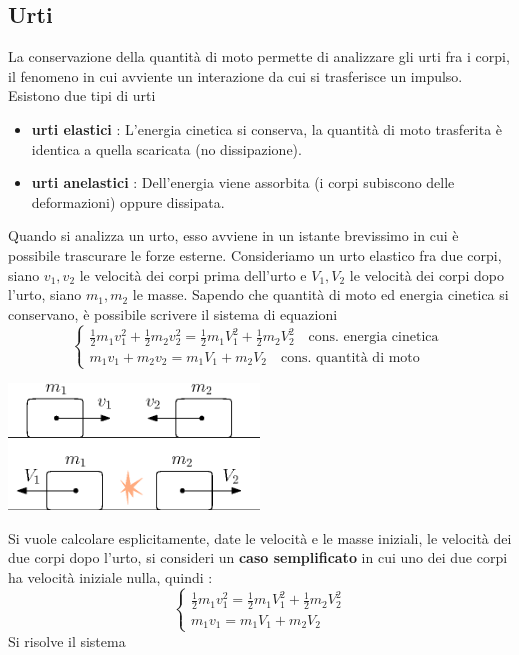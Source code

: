 \documentclass[10pt, letterpaper]{report}
\begin{document}
\subsection{Urti}
La conservazione della quantità di moto permette di analizzare 
gli urti fra i corpi, il fenomeno in cui avviente un interazione da cui 
si trasferisce un impulso. Esistono due tipi di urti\begin{itemize}
    \item \textbf{urti elastici} : L'energia cinetica si conserva, la quantità di 
    moto trasferita è identica a quella scaricata (no dissipazione). 
    \item \textbf{urti anelastici} : Dell'energia viene assorbita (i corpi 
    subiscono delle deformazioni) oppure dissipata.
\end{itemize}
Quando si analizza un urto, esso avviene in un istante brevissimo in 
cui è possibile 
trascurare le forze esterne. Consideriamo un urto elastico fra due 
corpi, siano $v_1,v_2$ le velocità dei corpi prima dell'urto e 
$V_1,V_2$ le velocità dei corpi dopo l'urto, siano $m_1,m_2$ le masse. Sapendo che quantità di moto ed 
energia cinetica si conservano, è possibile scrivere il sistema di equazioni 
$$ \begin{cases}
    \frac{1}{2}m_1v_1^2+\frac{1}{2}m_2v_2^2 =  \frac{1}{2}m_1V_1^2+\frac{1}{2}m_2V_2^2   \ \ \ \text{ cons. energia cinetica }\\
    m_1v_1+m_2v_2 = m_1V_1+m_2V_2 \ \ \ \text{ cons. quantità di moto }
\end{cases}$$
\begin{center}
    \includegraphics[width=0.5\textwidth ]{images/urti.eps}
\end{center}
Si vuole calcolare esplicitamente, date le velocità e le masse iniziali, le 
velocità dei due corpi dopo l'urto, si consideri un \textbf{caso semplificato} 
in cui uno dei due corpi ha velocità iniziale nulla, quindi : 
$$ \begin{cases}
    \frac{1}{2}m_1v_1^2=   \frac{1}{2}m_1V_1^2+\frac{1}{2}m_2V_2^2 \\
    m_1v_1 = m_1V_1+m_2V_2 
\end{cases}$$
Si risolve il sistema 
\end{document}
